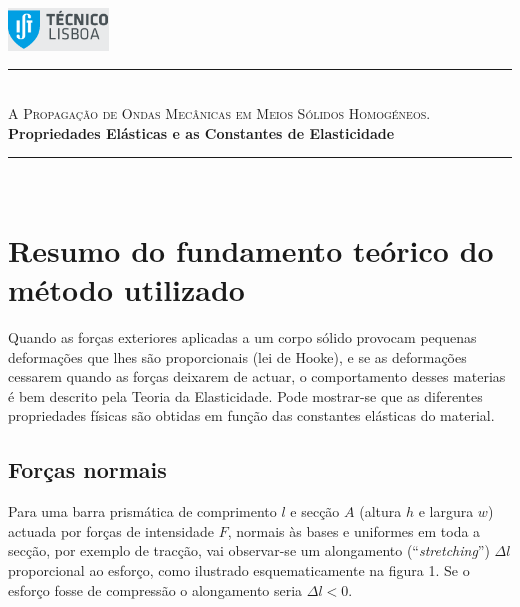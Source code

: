 \documentclass[a4paper,12pt]{article}
\author{Prof. Bernardo B. Carvalho}
\date{ Outubro 2012}
\newcommand{\HRule}{\rule{\linewidth}{0.5mm}}
\begin{document}
 

	\includegraphics[width=0.2\textwidth]{../logo-ist}%

	\HRule \\[0.5cm]
	{ \huge \sf  \textsc{A Propagação de Ondas Mecânicas em Meios Sólidos Homogéneos.}} \\[0.4cm] %
	{ \large \bfseries Propriedades Elásticas e as Constantes de Elasticidade}\\
	\HRule \\%

\section{\sf Resumo do fundamento teórico do método utilizado}
Quando as forças exteriores aplicadas a um corpo sólido provocam pequenas deformações que lhes são proporcionais (lei de Hooke), e se as deformações cessarem quando as forças deixarem de actuar, o comportamento desses materias é bem descrito pela Teoria da Elasticidade. Pode mostrar-se que as diferentes propriedades físicas são obtidas em função das constantes elásticas do material.

\subsection{\sf Forças normais }

Para uma barra prismática de comprimento $l$ e secção $A$ (altura $h$ e largura $w$) actuada por forças de intensidade $F$, normais às bases e uniformes em toda a secção, por exemplo de tracção, vai observar-se um alongamento (“\emph{stretching}”) $\Delta l$ proporcional ao esforço, como ilustrado esquematicamente na figura 1. Se o esforço fosse de compressão o alongamento seria $\Delta l<0$. 
\end{document}
